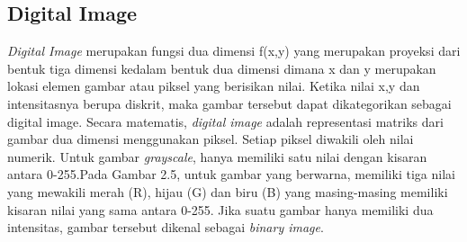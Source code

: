 \subsection{Digital Image}
\textit{Digital Image} merupakan fungsi dua dimensi f(x,y) yang merupakan proyeksi dari bentuk tiga dimensi kedalam 
bentuk dua dimensi dimana x dan y merupakan lokasi elemen gambar atau piksel yang berisikan nilai. Ketika
nilai x,y dan intensitasnya berupa diskrit, maka gambar tersebut dapat dikategorikan sebagai digital
image. Secara matematis, \textit{digital image} adalah representasi matriks dari gambar dua dimensi menggunakan
piksel. Setiap piksel  diwakili  oleh  nilai  numerik. Untuk  gambar  \textit{grayscale},  hanya  memiliki  
satu  nilai dengan kisaran antara 0-255.Pada Gambar 2.5, untuk gambar yang berwarna, memiliki tiga 
nilai yang mewakili merah (R), hijau (G) dan biru (B) yang masing-masing memiliki kisaran nilai yang 
sama antara 0-255. Jika suatu gambar hanya memiliki dua intensitas, gambar tersebut dikenal sebagai 
\textit{binary image}\citep{ImageProcesing}.
